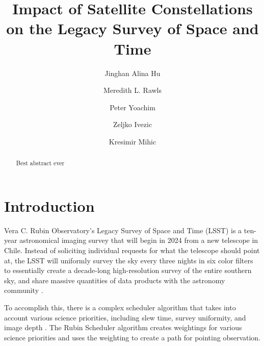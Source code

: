 \documentclass[linenumbers]{aastex631}
\begin{document}
\title{Impact of Satellite Constellations on the Legacy Survey of Space and Time}

\author[0000-0002-8400-1910]{Jinghan Alina Hu}
\author[0000-0003-1305-7308]{Meredith L. Rawls}
\author[0000-0003-2874-6464]{Peter Yoachim}
\author{Zeljko Ivezic}
\author{Kresimir Mihic}


\begin{abstract}
Best abstract ever

\end{abstract}


\section{Introduction} \label{sec:intro}

Vera C. Rubin Observatory's Legacy Survey of Space and Time (LSST) is a ten-year
astronomical imaging survey that will begin in 2024 from a new telescope in Chile. Instead
of soliciting individual requests for what the telescope should point at, the LSST will uniformly
survey the sky every three nights in six color filters to essentially create a decade-long
high-resolution survey of the entire southern sky, and share massive quantities of data products
with the astronomy community \citep{overview}.

To accomplish this, there is a complex scheduler algorithm that takes into account various
science priorities, including slew time, survey uniformity, and image depth \citep{naghib19}. The Rubin
Scheduler algorithm creates weightings for various science priorities and uses the weighting to
create a path for pointing observation.
\end{document}
